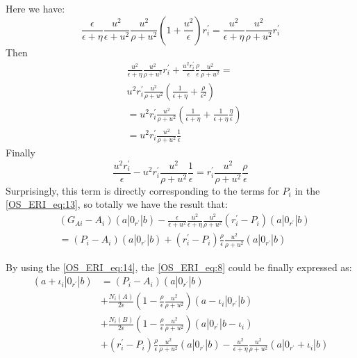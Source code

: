 Here we have:
\begin{equation}
\frac{\epsilon}{\epsilon+\eta}
\frac{u^{2}}{\epsilon+u^{2}}\frac{u^{2}}{\rho+u^{2}}\left(
1+\frac{u^{2}}{\epsilon} \right)r^{'}_{i} = 
\frac{u^{2}}{\epsilon+\eta}
\frac{u^{2}}{\rho+u^{2}}r^{'}_{i} 
\end{equation}
Then
\begin{equation}
\begin{split}
&\frac{u^{2}}{\epsilon+\eta}
\frac{u^{2}}{\rho+u^{2}}r^{'}_{i} + 
\frac{u^{2}r^{'}_{i}}{\epsilon}
\frac{\rho}{\epsilon}
\frac{u^{2}}{\rho+u^{2}} = \\
&{u^{2}}r^{'}_{i}
\frac{u^{2}}{\rho+u^{2}}\left(\frac{1}{\epsilon+\eta} + 
\frac{\rho}{\epsilon^{2}} \right) \\
&= {u^{2}}r^{'}_{i}
\frac{u^{2}}{\rho+u^{2}}\left(\frac{1}{\epsilon+\eta} + 
\frac{1}{\epsilon+\eta}\frac{\eta}{\epsilon} \right) \\
&= {u^{2}}r^{'}_{i}
\frac{u^{2}}{\rho+u^{2}}\frac{1}{\epsilon}
\end{split}
\end{equation}
Finally
\begin{equation}
\frac{u^{2} r^{'}_{i}}{\epsilon}
-{u^{2}}r^{'}_{i}
\frac{u^{2}}{\rho+u^{2}}\frac{1}{\epsilon} = r^{'}_{i}
\frac{u^{2}}{\rho+u^{2}}\frac{\rho}{\epsilon}
\end{equation}
Surprisingly, this term is directly corresponding to the terms for $P_{i}$
in the \ref{OS_ERI_eq:13}, so totally we have the result that:
\begin{equation}
\begin{split}
&(G_{Ai} - A_{i})(a|0_{r^{'}}|b)
-\frac{\epsilon}{\epsilon+u^{2}}
\frac{u^{2}}{\epsilon+\eta}\frac{u^{2}}{\rho+u^{2}}(r^{'}_{i} -
P_{i})(a|0_{r^{'}}|b)  \\
&= \left( P_{i} - A_{i}\right)(a|0_{r^{'}}|b) + 
(r^{'}_{i}-P_{i})\frac{\rho}{\epsilon}
\frac{u^{2}}{\rho+u^{2}}(a|0_{r^{'}}|b)
\end{split}
\label{OS_ERI_eq:14}
\end{equation}
 
By using the \ref{OS_ERI_eq:14}, the \ref{OS_ERI_eq:8} could be finally
expressed as:
\begin{equation}
 \begin{split}
  (a+\iota_{i}|0_{r^{'}}|b)
&=(P_{i} - A_{i})(a|0_{r^{'}}|b) \\
&+
\frac{N_{i}(A)}{2\epsilon}\left(1-\frac{\rho}{\epsilon}
\frac{u^{2}}{\rho+u^{2}}\right)(a-\iota_{i}|0_{r^{'}}|b) \\
&+ \frac{N_{i}(B)}{2\epsilon}\left(1-\frac{\rho}{\epsilon}
\frac{u^{2}}{\rho+u^{2}}\right)(a|0_{r^{'}}|b-\iota_{i}) \\
&+(r^{'}_{i}-P_{i})\frac{\rho}{\epsilon}
\frac{u^{2}}{\rho+u^{2}}(a|0_{r^{'}}|b) 
-\frac{u^{2}}{\epsilon+\eta}\frac{u^{2}}{\rho+u^{2}}(a|0_{r^{'}}+\iota_{i}|b)
 \end{split}
\label{OS_ERI_eq:15}
\end{equation}

